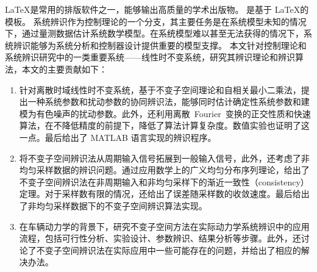 \begin{cabstract}
  \LaTeX 是常用的排版软件之一，能够输出高质量的学术出版物。
  \tongjithesis{} 是基于 \LaTeX 的模板。
  系统辨识作为控制理论的一个分支，其主要任务是在系统模型未知的情况下，通过量测数据估计系统数学模型。在系统模型难以甚至无法获得的情况下，系统辨识能够为系统分析和控制器设计提供重要的模型支撑。
  本文针对控制理论和系统辨识研究中的一类重要系统——线性时不变系统，研究其辨识理论和辨识算法，本文的主要贡献如下：
  
  \begin{enumerate}[1.]
    \item 针对离散时域线性时不变系统，基于不变子空间理论和自相关最小二乘法，提出一种系统参数和扰动参数的协同辨识法，能够同时估计确定性系统参数和建模为有色噪声的扰动参数。此外，还利用离散~Fourier~变换的正交性质和快速算法，在不降低精度的前提下，降低了算法计算复杂度。数值实验也证明了这一点。最后给出了 MATLAB 语言实现的辨识程序。
    
    \item 将不变子空间辨识法从周期输入信号拓展到一般输入信号，此外，还考虑了非均匀采样数据的辨识问题。通过应用数学上的广义均匀分布序列理论，给出了不变子空间辨识法在非周期输入和非均匀采样下的渐近一致性（consistency）定理。对于采样数有限的情况，还给出了误差随采样数的收敛速度。最后给出了非均匀采样数据下的不变子空间辨识算法实现。
    
    \item 在车辆动力学的背景下，研究不变子空间方法在实际动力学系统辨识中的应用流程，包括可行性分析、实验设计、参数辨识、结果分析等步骤。此外，还讨论了不变子空间辨识法在实际应用中一些可能存在的问题，并给出了相应的解决办法。
  \end{enumerate}

\end{cabstract}


